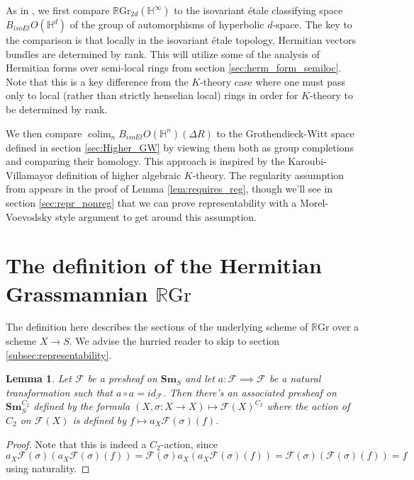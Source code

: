 \documentclass[edeposit,fullpage]{uiucthesis2009}
\newcommand{\mbb}{\mathbb}
\newcommand{\mc}{\mathcal}
\newcommand{\RGr}{\mathbb R\mathrm{Gr}}
\newcommand{\Sm}[1]{\mathbf{Sm}_{#1}}
\DeclareMathOperator*{\colim}{colim}
\theoremstyle{plain}
\newtheorem{lemma}{Lemma}
\numberwithin{lemma}{section}
\theoremstyle{definition}
\begin{document}
As in \cite{SchTri}, we first compare $\RGr_{2d}(\mbb H^\infty)$ to the isovariant \'etale
classifying space $B_{isoEt}O(\mbb H^{d})$ of the group of automorphisms of
hyperbolic $d$-space. The key to the comparison is that locally in the
isovariant \'etale topology, Hermitian vectors bundles are determined
by rank. This will utilize some of the analysis of
Hermitian forms over semi-local rings from section
\ref{sec:herm_form_semiloc}. Note that this is a key difference from
the $K$-theory case where one must pass only to local (rather than
strictly henselian local) rings in order for $K$-theory to be
determined by rank. 

We then compare $\colim_n B_{isoEt}O(\mbb H^n)(\Delta R)$ to
the Grothendieck-Witt space defined in section \ref{sec:Higher_GW} by viewing them both as group completions
and comparing their homology. This approach is inspired by the
Karoubi-Villamayor definition of higher algebraic $K$-theory. The regularity assumption from \cite{SchTri} appears in the proof of Lemma
\ref{lem:requires_reg}, though we'll see in section
\ref{sec:repr_nonreg} that we can prove representability with a
Morel-Voevodsky style argument to get around this assumption.

\section{The definition of the Hermitian Grassmannian $\RGr$}

The definition here describes the sections of the underlying scheme of
$\RGr$ over a scheme $X \rightarrow S$. We advise the hurried reader to
skip to section \ref{subsec:representability}.

\begin{lemma}\label{lem:action_presheaf}
Let $\mc F$ be a presheaf on $\Sm{S}$ and let $a : \mc F \implies
\mc F$ be a natural transformation such that $a \circ a = id_{\mc F}$. Then
there's an associated presheaf on $\Sm{S}^{C_2}$ defined by the formula
$(X,\sigma : X \rightarrow X) \mapsto \mc F(X)^{C_2}$ where the action
of $C_2$ on $\mc F(X)$ is defined by $f \mapsto  a_X\mc F(\sigma)(f)$.
\end{lemma}

\begin{proof}
Note that this is indeed a $C_2$-action, since $a_X \mc F(\sigma)(
a_X\mc F(\sigma)(f)) = \mc F(\sigma) a_X(a_X \mc F(\sigma)(f)) = \mc
F(\sigma)(\mc F(\sigma)(f)) = f$ using naturality. 
\end{proof}
\end{document}

